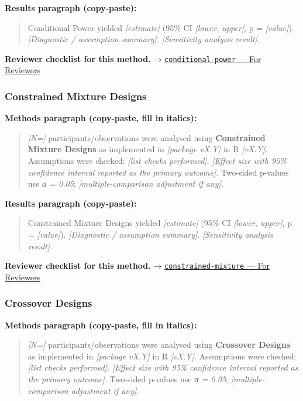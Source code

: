 \documentclass[
]{article}
\begin{document}
\textbf{Results paragraph (copy-paste):}

\begin{quote}
Conditional Power yielded \emph{{[}estimate{]}} (95\% CI \emph{{[}lower,
upper{]}}, p = \emph{{[}value{]}}). \emph{{[}Diagnostic / assumption
summary{]}}. \emph{{[}Sensitivity analysis result{]}}.
\end{quote}

\textbf{Reviewer checklist for this method.} →
\href{../chapters/14-clinical/conditional-power.Rmd\#for-reviewers}{\texttt{conditional-power}
--- For Reviewers}

\subsubsection{Constrained Mixture
Designs}\label{constrained-mixture-designs}

\textbf{Methods paragraph (copy-paste, fill in italics):}

\begin{quote}
\emph{{[}N={]}} participants/observations were analysed using
\textbf{Constrained Mixture Designs} as implemented in \emph{{[}package
vX.Y{]}} in R \emph{{[}vX.Y{]}}. Assumptions were checked: \emph{{[}list
checks performed{]}}. \emph{{[}Effect size with 95\% confidence interval
reported as the primary outcome{]}}. Two-sided p-values use \emph{α =
0.05}; \emph{{[}multiple-comparison adjustment if any{]}}.
\end{quote}

\textbf{Results paragraph (copy-paste):}

\begin{quote}
Constrained Mixture Designs yielded \emph{{[}estimate{]}} (95\% CI
\emph{{[}lower, upper{]}}, p = \emph{{[}value{]}}). \emph{{[}Diagnostic
/ assumption summary{]}}. \emph{{[}Sensitivity analysis result{]}}.
\end{quote}

\textbf{Reviewer checklist for this method.} →
\href{../chapters/16-design/constrained-mixture.Rmd\#for-reviewers}{\texttt{constrained-mixture}
--- For Reviewers}

\subsubsection{Crossover Designs}\label{crossover-designs}

\textbf{Methods paragraph (copy-paste, fill in italics):}

\begin{quote}
\emph{{[}N={]}} participants/observations were analysed using
\textbf{Crossover Designs} as implemented in \emph{{[}package vX.Y{]}}
in R \emph{{[}vX.Y{]}}. Assumptions were checked: \emph{{[}list checks
performed{]}}. \emph{{[}Effect size with 95\% confidence interval
reported as the primary outcome{]}}. Two-sided p-values use \emph{α =
0.05}; \emph{{[}multiple-comparison adjustment if any{]}}.
\end{quote}
\end{document}
